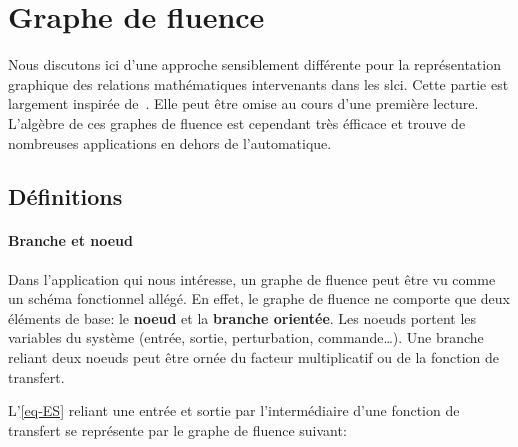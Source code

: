 \section{Graphe de fluence}
Nous discutons ici d'une approche sensiblement différente 
pour la représentation graphique des relations mathématiques 
intervenants dans les \gls{slci}. Cette partie est largement
inspirée de~\cite{Ostertag}. Elle peut être omise au cours 
d'une première lecture. L'algèbre de ces graphes de fluence
est cependant très éfficace et trouve de nombreuses applications 
en dehors de l'automatique. 

\subsection{Définitions}

\paragraph{Branche et noeud}

Dans l'application qui nous intéresse, un graphe de fluence 
peut être vu comme un schéma fonctionnel allégé. En effet, le graphe de fluence 
ne comporte que deux éléments de base: le \textbf{noeud} et la 
\textbf{branche orientée}. Les noeuds portent les variables du système 
(entrée, sortie, perturbation, commande\ldots). 
Une branche reliant deux noeuds peut être ornée du facteur multiplicatif ou 
de la fonction de transfert.

L'\cref{eq-ES} reliant une entrée et sortie par l'intermédiaire d'une fonction 
de transfert se représente par le graphe de fluence suivant:

